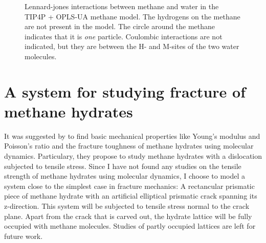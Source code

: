 \begin{figure}
\centering
{}
\caption{Lennard-jones interactions between methane and water in the TIP4P + OPLS-UA methane model. The hydrogens on the methane are not present in the model. The circle around the methane indicates that it is \emph{one} particle. Coulombic interactions are not indicated, but they are between the H- and M-sites of the two water molecules.}
\end{figure}

\section{A system for studying fracture of methane hydrates}
It was suggested by \citet{Ning2012} to find basic mechanical properties like Young's modulus and Poisson's ratio and the fracture toughness of methane hydrates using molecular dynamics. Particulary, they propose to study methane hydrates with a dislocation subjected to tensile stress. Since I have not found any studies on the tensile strength of methane hydrates using molecular dynamics, I choose to model a system close to the simplest case in fracture mechanics: A rectancular prismatic piece of methane hydrate with an artificial elliptical prismatic crack spanning its z-direction. This system will be subjected to tensile stress normal to the crack plane. Apart from the crack that is carved out, the hydrate lattice will be fully occupied with methane molecules. Studies of partly occupied lattices are left for future work.

